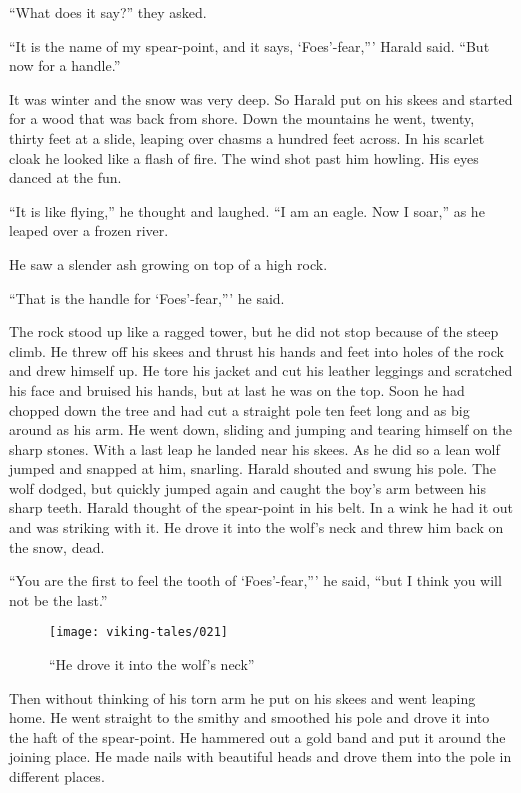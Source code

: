 ``What does it say?'' they asked.

``It is the name of my spear-point, and it says, `Foes'-fear,''' Harald
said. ``But now for a handle.''

It was winter and the snow was very deep. So Harald put on his skees and
started for a wood that was back from shore. Down the mountains he went,
twenty, thirty feet at a slide, leaping over chasms a hundred feet
across. In his scarlet cloak he looked like a flash of fire. The wind
shot past him howling. His eyes danced at the fun.

``It is like flying,'' he thought and laughed. ``I am an eagle. Now I
soar,'' as he leaped over a frozen river.

He saw a slender ash growing on top of a high rock.

``That is the handle for `Foes'-fear,''' he said.

The rock stood up like a ragged tower, but he did not stop because of
the steep climb. He threw off his skees and thrust his hands and feet
into holes of the rock and drew himself up. He tore his jacket and cut
his leather leggings and scratched his face and bruised his hands, but
at last he was on the top. Soon he had chopped down the tree and had cut
a straight pole ten feet long and as big around as his arm. He went
down, sliding and jumping and tearing himself on the sharp stones. With
a last leap he landed near his skees. As he did so a lean wolf jumped
and snapped at him, snarling. Harald shouted and swung his pole. The
wolf dodged, but quickly jumped again and caught the boy's arm between
his sharp teeth. Harald thought of the spear-point in his belt. In a
wink he had it out and was striking with it. He drove it into the wolf's
neck and threw him back on the snow, dead.

``You are the first to feel the tooth of `Foes'-fear,''' he said, ``but
I think you will not be the last.''

\begin{figure}[ht]
    \centering
    \texttt{[image: viking-tales/021]}
    \caption{``He drove it into the wolf's neck''}
\end{figure}

Then without thinking of his torn arm he put on his skees and went
leaping home. He went straight to the smithy and smoothed his pole and
drove it into the haft of the spear-point. He hammered out a gold band
and put it around the joining place. He made nails with beautiful heads
and drove them into the pole in different places.

